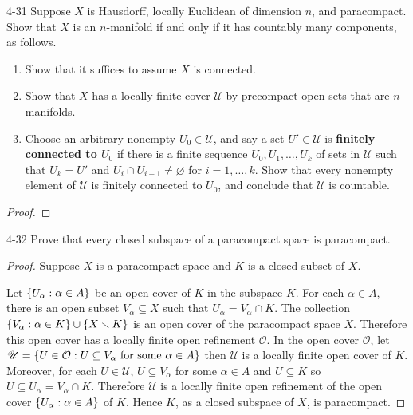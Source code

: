 \begin{problem}{4-31}
Suppose $X$ is Hausdorff, locally Euclidean of dimension $n$, and paracompact. Show that $X$ is an $n$-manifold if and only if it has countably many components, as follows.
\begin{enumerate}[label={(\alph*)},itemsep=0pt]
	\item Show that it suffices to assume $X$ is connected.
	\item Show that $X$ has a locally finite cover $\mathscr{U}$ by precompact open sets that are $n$-manifolds.
	\item Choose an arbitrary nonempty $U_{0} \in \mathscr{U}$, and say a set $U' \in \mathscr{U}$ is \textbf{finitely connected to $U_{0}$} if there is a finite sequence $U_{0}, U_{1}, \ldots, U_{k}$ of sets in $\mathscr{U}$ such that $U_{k} = U'$ and $U_{i} \cap U_{i-1} \ne \varnothing$ for $i = 1, \ldots, k$. Show that every nonempty element of $\mathscr{U}$ is finitely connected to $U_{0}$, and conclude that $\mathscr{U}$ is countable.
\end{enumerate}
\end{problem}


\begin{proof}
\end{proof}

\begin{problem}{4-32}\label{problem:4-32}
Prove that every closed subspace of a paracompact space is paracompact.
\end{problem}

\begin{proof}
	Suppose $X$ is a paracompact space and $K$ is a closed subset of $X$.

	Let $\left\{{ U_{\alpha}: \alpha\in A }\right\}$ be an open cover of $K$ in the subspace $K$. For each $\alpha\in A$, there is an open subset $V_{\alpha}\subseteq X$ such that $U_{\alpha} = V_{\alpha}\cap K$. The collection $\left\{{ V_{\alpha} : \alpha\in K }\right\} \cup \left\{{ X\smallsetminus K }\right\}$ is an open cover of the paracompact space $X$. Therefore this open cover has a locally finite open refinement $\mathcal{O}$. In the open cover $\mathcal{O}$, let $\mathscr{U} = \left\{{ U \in \mathcal{O} : \text{$U \subseteq V_{\alpha}$ for some $\alpha\in A$} }\right\}$ then $\mathscr{U}$ is a locally finite open cover of $K$. Moreover, for each $U\in \mathscr{U}$, $U \subseteq V_{\alpha}$ for some $\alpha\in A$ and $U\subseteq K$ so $U \subseteq U_{\alpha} = V_{\alpha}\cap K$. Therefore $\mathscr{U}$ is a locally finite open refinement of the open cover $\left\{{ U_{\alpha}: \alpha\in A }\right\}$ of $K$. Hence $K$, as a closed subspace of $X$, is paracompact.
\end{proof}

